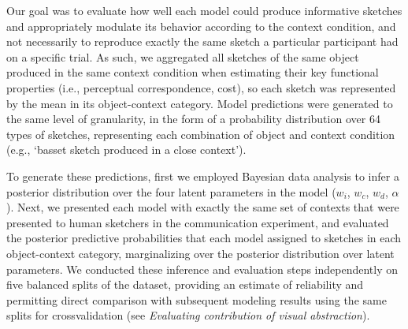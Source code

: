 \documentclass[9pt,twocolumn,twoside]{pnas-new}
\newcommand{\rdh}[1]{{\color{blue}{[rdh: #1]}}}
\begin{document}

Our goal was to evaluate how well each model could produce informative sketches and appropriately modulate its behavior according to the context condition, and not necessarily to reproduce exactly the same sketch a particular participant had on a specific trial. 
As such, we aggregated all sketches of the same object produced in the same context condition when estimating their key functional properties (i.e., perceptual correspondence, cost), so each sketch was represented by the mean in its object-context category. 
Model predictions were generated to the same level of granularity, in the form of a probability distribution over 64 types of sketches, representing each combination of object and context condition (e.g., `basset sketch produced in a close context'). 

To generate these predictions, first we employed Bayesian data analysis to infer a posterior distribution over the four latent parameters in the model ($w_{i}$, $w_{c}$, $w_{d}$, $\alpha$). 
Next, we presented each model with exactly the same set of contexts that were presented to human sketchers in the communication experiment, and evaluated the posterior predictive probabilities that each model assigned to sketches in each object-context category, marginalizing over the posterior distribution over latent parameters. 
We conducted these inference and evaluation steps independently on five balanced splits of the dataset, providing an estimate of reliability and permitting direct comparison with subsequent modeling results using the same splits for crossvalidation (see \textit{Evaluating contribution of visual abstraction}). 
\end{document}
